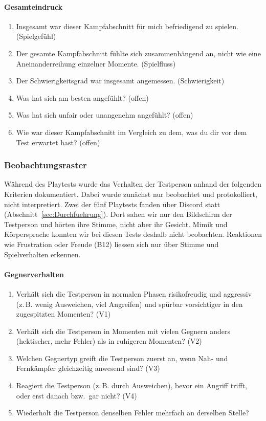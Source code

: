 \documentclass[../Main.tex]{subfiles}
\begin{document}
\paragraph{Gesamteindruck}
\begin{enumerate}[label=\textbf{Q\arabic*}, leftmargin=1.5cm, itemsep=0.5em, resume]
    \item Insgesamt war dieser Kampfabschnitt für mich befriedigend zu spielen. \hfill (Spielgefühl)
    \item Der gesamte Kampfabschnitt fühlte sich zusammenhängend an, nicht wie eine Aneinanderreihung einzelner Momente. \hfill (Spielfluss)
    \item Der Schwierigkeitsgrad war insgesamt angemessen. \hfill (Schwierigkeit)
    \item Was hat sich am besten angefühlt? \hfill (offen)
    \item Was hat sich unfair oder unangenehm angefühlt? \hfill (offen)
    \item Wie war dieser Kampfabschnitt im Vergleich zu dem, was du dir vor dem Test erwartet hast? \hfill (offen)
\end{enumerate}

\subsubsection{Beobachtungsraster} \label{sec:Beobachtungsraster}

Während des Playtests wurde das Verhalten der Testperson anhand der folgenden Kriterien dokumentiert. Dabei wurde zunächst nur beobachtet und protokolliert, nicht interpretiert. Zwei der fünf Playtests fanden über Discord statt (Abschnitt~\ref{sec:Durchfuehrung}). Dort sahen wir nur den Bildschirm der Testperson und hörten ihre Stimme, nicht aber ihr Gesicht. Mimik und Körpersprache konnten wir bei diesen Tests deshalb nicht beobachten. Reaktionen wie Frustration oder Freude (B12) liessen sich nur über Stimme und Spielverhalten erkennen.

\paragraph{Gegnerverhalten}
\begin{enumerate}[label=\textbf{B\arabic*}, leftmargin=1.5cm, itemsep=0.5em]
    \item Verhält sich die Testperson in normalen Phasen risikofreudig und aggressiv (z.\,B. wenig Ausweichen, viel Angreifen) und spürbar vorsichtiger in den zugespitzten Momenten? \hfill (V1)
    \item Verhält sich die Testperson in Momenten mit vielen Gegnern anders (hektischer, mehr Fehler) als in ruhigeren Momenten? \hfill (V2)
    \item Welchen Gegnertyp greift die Testperson zuerst an, wenn Nah- und Fernkämpfer gleichzeitig anwesend sind? \hfill (V3)
    \item Reagiert die Testperson (z.\,B. durch Ausweichen), bevor ein Angriff trifft, oder erst danach bzw.\ gar nicht? \hfill (V4)
    \item Wiederholt die Testperson denselben Fehler mehrfach an derselben Stelle?
\end{enumerate}
\end{document}
